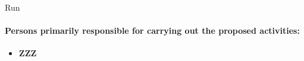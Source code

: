 \begin{sitedescription}{Run}

\paragraph{Persons primarily responsible for carrying out the proposed activities:}

\begin{itemize} %

\item{\bf ZZZ}

\end{itemize}

\end{sitedescription}

